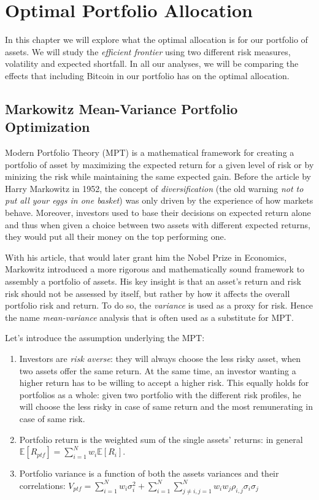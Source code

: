 \chapter{Optimal Portfolio Allocation}
\label{chpr:markowitz}

In this chapter we will explore what the optimal allocation is for our portfolio of assets. We will study the \textit{efficient frontier} using two different risk measures, volatility and expected shortfall. In all our analyses, we will be comparing the effects that including Bitcoin in our portfolio has on the optimal allocation.


\section{Markowitz Mean-Variance Portfolio Optimization}
\label{sec:markowitz_theory}

Modern Portfolio Theory (MPT) is a mathematical framework for creating a portfolio of asset by maximizing the expected return for a given level of risk or by minizing the risk while maintaining the same expected gain. 
Before the article \citep{MARKOWITZ1952} by Harry Markowitz in 1952, the concept of \textit{diversification} (the old warning \textit{not to put all your eggs in one basket}) was only driven by the experience of how markets behave.
Moreover, investors used to base their decisions on expected return alone and thus when given a choice between two assets with different expected returns, they would put all their money on the top performing one.

With his article, that would later grant him the Nobel Prize in Economics, Markowitz introduced a more rigorous and mathematically sound framework to assembly a portfolio of assets. His key insight is that an asset's return and risk risk should not be assessed by itself, but rather by how it affects the overall portfolio risk and return.
To do so, the \textit{variance} is used as a proxy for risk. Hence the name \textit{mean-variance } analysis that is often used as a substitute for MPT.

\bigskip
Let's introduce the assumption underlying the MPT:
\begin{enumerate}
	\item Investors are \textit{risk averse}: they will always choose the less risky asset, when two assets offer the same return.  At the same time, an investor wanting a higher return has to be willing to accept a higher risk.
	This equally holds for portfolios as a whole: given two portfolio with the different risk profiles, he will choose the less risky in case of same return and the most remunerating in case of same risk.
	\item Portfolio return is the weighted sum of the single assets' returns: in general $\mathbb{E}[R_{ptf}] = \sum_{i=1}^{N} w_i \mathbb{E}[R_i]$.
	\item Portfolio variance is a function of both the assets variances and their correlations: $V_{ptf} = \sum_{i=1}^{N} w_i \sigma_i^2 + \sum_{i=1}^{N}\sum_{j\neq i , j=1}^{N} w_i w_j \rho_{i,j}\sigma_i\sigma_j$
\end{enumerate}

